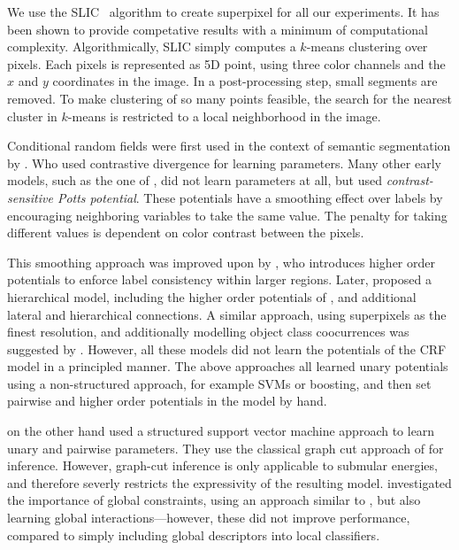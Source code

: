 We use the SLIC~\citep{achanta2012slic} algorithm to create superpixel for all
our experiments.  It has been shown to provide competative results with a
minimum of computational complexity.  Algorithmically, SLIC simply computes a
$k$-means clustering over pixels. Each pixels is represented as 5D point, using
three color channels and the $x$ and $y$ coordinates in the image.  In a
post-processing step, small segments are removed. To make clustering of so many
points feasible, the search for the nearest cluster in $k$-means is restricted
to a local neighborhood in the image.




Conditional random fields were first used in the context of semantic
segmentation by \citet{he2004multiscale}.  Who used contrastive divergence for
learning parameters. Many other early models, such as the one of
\citet{shotton2006textonboost}, did not learn parameters at all, but used
\emph{contrast-sensitive Potts potential}. These potentials have a smoothing
effect over labels by encouraging neighboring variables to take the same value.
The penalty for taking different values is dependent on color contrast between
the pixels.

This smoothing approach was improved upon by \citet{kohli2009robust}, who
introduces higher order potentials to enforce label consistency within larger
regions. Later, \citet{ladicky2009associative} proposed a hierarchical model,
including the higher order potentials of \citet{kohli2009robust}, and
additional lateral and hierarchical connections. A similar approach, using
superpixels as the finest resolution, and additionally modelling object class
coocurrences was suggested by \citet{gonfaus2010harmony}.  However, all these
models did not learn the potentials of the CRF model in a principled manner.
The above approaches all learned unary potentials using a non-structured
approach, for example SVMs or boosting, and then set pairwise and higher order
potentials in the model by hand.

\citet{szummer2008learning} on the other hand used a structured support vector
machine approach to learn unary and pairwise parameters. They use the classical
graph cut approach of \citet{boykov2001fast} for inference.  However, graph-cut
inference is only applicable to submular energies, and therefore severly
restricts the expressivity of the resulting model.
\citet{lucchi2011spatial} investigated the importance of global constraints,
using an approach similar to \citet{szummer2008learning}, but also learning
global interactions---however, these did not improve performance, compared to
simply including global descriptors into local classifiers.


